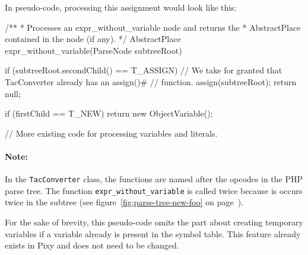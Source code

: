 In pseudo-code, processing this assignment would look like this:

\begin{textcode}
/**
 * Processes an expr_without_variable node and returns the
 * AbstractPlace contained in the node (if any).
 */
AbstractPlace expr_without_variable(ParseNode subtreeRoot) {
  if (subtreeRoot.secondChild() == T_ASSIGN) {
    // We take for granted that TacConverter already has an assign()#
    // function.
    assign(subtreeRoot);
    return null;
  }

  if (firstChild == T_NEW) {
    return new ObjectVariable();
  }

  // More existing code for processing variables and literals.
}
\end{textcode}

\paragraph{Note:} In the \texttt{TacConverter} class, the functions are named after the opcodes in the PHP parse tree. The function \texttt{expr\_without\_variable} is called twice because is occurs twice in the subtree (see figure~\ref{fig:parse-tree-new-foo} on page~\pageref{fig:parse-tree-new-foo}).

For the sake of brevity, this pseudo-code omits the part about creating temporary variables if a variable already is present in the symbol table. This feature already exists in Pixy and does not need to be changed.


